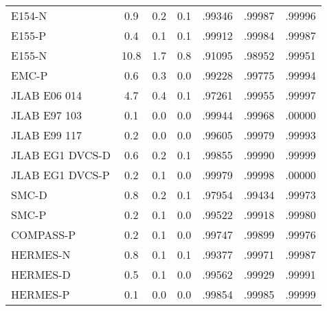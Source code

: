 \begin{tabular}{lccc@{\hspace{1cm}}ccc}
               E154-N   &    0.9    &     0.2   &    0.1   &  .99346  &  .99987  &  .99996 \\
               E155-P   &    0.4    &     0.1   &    0.1   &  .99912  &  .99984  &  .99987 \\
               E155-N   &   10.8    &     1.7   &    0.8   &  .91095  &  .98952  &  .99951 \\
                EMC-P   &    0.6    &     0.3   &    0.0   &  .99228  &  .99775  &  .99994 \\
         JLAB E06 014   &    4.7    &     0.4   &    0.1   &  .97261  &  .99955  &  .99997 \\
         JLAB E97 103   &    0.1    &     0.0   &    0.0   &  .99944  &  .99968  &  .00000 \\
         JLAB E99 117   &    0.2    &     0.0   &    0.0   &  .99605  &  .99979  &  .99993 \\
      JLAB EG1 DVCS-D   &    0.6    &     0.2   &    0.1   &  .99855  &  .99990  &  .99999 \\
      JLAB EG1 DVCS-P   &    0.2    &     0.1   &    0.0   &  .99979  &  .99998  &  .00000 \\
                SMC-D   &    0.8    &     0.2   &    0.1   &  .97954  &  .99434  &  .99973 \\
                SMC-P   &    0.2    &     0.1   &    0.0   &  .99522  &  .99918  &  .99980 \\
            COMPASS-P   &    0.2    &     0.1   &    0.0   &  .99747  &  .99899  &  .99976 \\
             HERMES-N   &    0.8    &     0.1   &    0.1   &  .99377  &  .99971  &  .99987 \\
             HERMES-D   &    0.5    &     0.1   &    0.0   &  .99562  &  .99929  &  .99991 \\
             HERMES-P   &    0.1    &     0.0   &    0.0   &  .99854  &  .99985  &  .99999 \\
  \midrule \bottomrule
\end{tabular}
